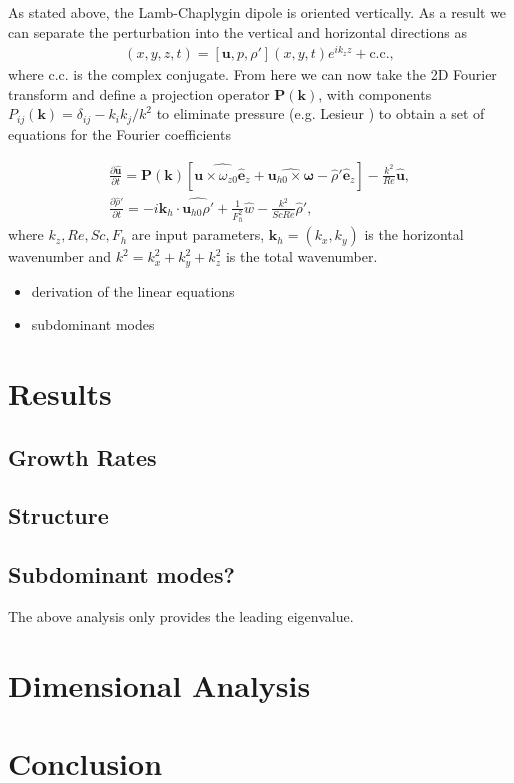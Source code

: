 As stated above, the Lamb-Chaplygin dipole is oriented vertically. As a result we can separate the perturbation into the vertical and horizontal directions as 
\begin{align} 
[\tilde{\bm{u}},\tilde{p},\tilde{\rho}'](x,y,z,t) = [\bm{u},p,\rho'](x,y,t)e^{ik_{z}z} + \text{c.c.},
\end{align}
where c.c. is the complex conjugate. From here we can now take the 2D Fourier transform and define a projection operator $\textbf{P}(\textbf{k})$, with components $P_{ij}(\textbf{k})=\delta_{ij} - k_{i}k_{j}/k^{2}$ to eliminate pressure (e.g. Lesieur \cite{lesieur}) to obtain a set of equations for the Fourier coefficients 

\begin{align}
\frac{\partial \hat{\bm{u}}}{\partial t} = \textbf{P}(\textbf{k})[\widehat{\bm{u}\times \omega_{z0}\hat{\bm{e}}_{z}} + \widehat{\bm{u}_{h0}\times\bm{\omega}}-\hat{\rho}'\hat{\bm{e}}_{z}] - \frac{k^{2}}{Re}\hat{\bm{u}},\label{solve1}\\
\frac{\partial\hat{\rho}'}{\partial t} = -i\bm{k}_{h}\cdot\widehat{\bm{u}_{h0}\rho'} + \frac{1}{F_{h}^{2}}\hat{w}- \frac{k^{2}}{ScRe}\hat{\rho}',\label{solve2}
\end{align}
where $k_{z},Re,Sc,F_{h}$ are input parameters, $\bm{k}_{h}=(k_{x},k_{y})$ is the horizontal wavenumber and $k^{2}=k_{x}^{2}+k_{y}^{2}+k_{z}^{2}$ is the total wavenumber. 
\begin{itemize}
	\item derivation of the linear equations
	\item subdominant modes
\end{itemize} 

\section{Results}

\subsection{Growth Rates}
\subsection{Structure}
\subsection{Subdominant modes?} 
The above analysis only provides the leading eigenvalue. 
\section{Dimensional Analysis}

\section{Conclusion}

